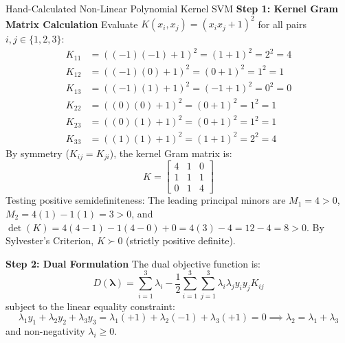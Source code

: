 \begin{examplebox}[breakable]{Hand-Calculated Non-Linear Polynomial Kernel SVM}
\textbf{Step 1: Kernel Gram Matrix Calculation}
Evaluate $K(x_i, x_j) = (x_i x_j + 1)^2$ for all pairs $i, j \in \{1, 2, 3\}$:
\begin{align}
K_{11} &= ((-1)(-1) + 1)^2 = (1 + 1)^2 = 2^2 = 4 \\
K_{12} &= ((-1)(0) + 1)^2 = (0 + 1)^2 = 1^2 = 1 \\
K_{13} &= ((-1)(1) + 1)^2 = (-1 + 1)^2 = 0^2 = 0 \\
K_{22} &= ((0)(0) + 1)^2 = (0 + 1)^2 = 1^2 = 1 \\
K_{23} &= ((0)(1) + 1)^2 = (0 + 1)^2 = 1^2 = 1 \\
K_{33} &= ((1)(1) + 1)^2 = (1 + 1)^2 = 2^2 = 4
\end{align}
By symmetry ($K_{ij} = K_{ji}$), the kernel Gram matrix is:
\begin{equation}
K = \begin{bmatrix} 4 & 1 & 0 \\ 1 & 1 & 1 \\ 0 & 1 & 4 \end{bmatrix}
\end{equation}
Testing positive semidefiniteness: The leading principal minors are $M_1 = 4 > 0$, $M_2 = 4(1) - 1(1) = 3 > 0$, and $\det(K) = 4(4 - 1) - 1(4 - 0) + 0 = 4(3) - 4 = 12 - 4 = 8 > 0$. By Sylvester's Criterion, $K \succ 0$ (strictly positive definite).

\textbf{Step 2: Dual Formulation}
The dual objective function is:
\begin{equation}
D(\boldsymbol{\lambda}) = \sum_{i=1}^3 \lambda_i - \frac{1}{2} \sum_{i=1}^3 \sum_{j=1}^3 \lambda_i \lambda_j y_i y_j K_{ij}
\end{equation}
subject to the linear equality constraint:
\begin{equation}
\lambda_1 y_1 + \lambda_2 y_2 + \lambda_3 y_3 = \lambda_1(+1) + \lambda_2(-1) + \lambda_3(+1) = 0 \implies \lambda_2 = \lambda_1 + \lambda_3
\label{eq:kernel_svm_eq_constr}
\end{equation}
and non-negativity $\lambda_i \ge 0$.


\end{examplebox}
